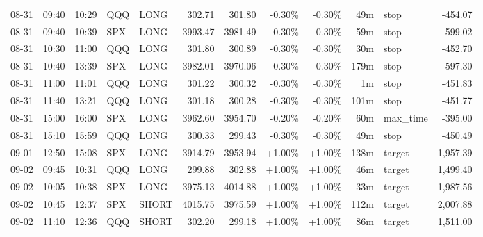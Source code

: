 \documentclass[11pt,a4paper,twoside]{article}
\begin{document}
\begin{center}
\begin{longtable}{>{\color{txtmain}}l l l l l r r r r r >{\color{txtmain}}l r}
08-31 & 09:40 & 10:29 & QQQ & LONG & 302.71 & 301.80 & \textcolor{lossred}{-0.30\%} & \textcolor{lossred}{-0.30\%} & 49m & stop & \textcolor{lossred}{-454.07} \\
08-31 & 09:40 & 10:39 & SPX & LONG & 3993.47 & 3981.49 & \textcolor{lossred}{-0.30\%} & \textcolor{lossred}{-0.30\%} & 59m & stop & \textcolor{lossred}{-599.02} \\
08-31 & 10:30 & 11:00 & QQQ & LONG & 301.80 & 300.89 & \textcolor{lossred}{-0.30\%} & \textcolor{lossred}{-0.30\%} & 30m & stop & \textcolor{lossred}{-452.70} \\
08-31 & 10:40 & 13:39 & SPX & LONG & 3982.01 & 3970.06 & \textcolor{lossred}{-0.30\%} & \textcolor{lossred}{-0.30\%} & 179m & stop & \textcolor{lossred}{-597.30} \\
08-31 & 11:00 & 11:01 & QQQ & LONG & 301.22 & 300.32 & \textcolor{lossred}{-0.30\%} & \textcolor{lossred}{-0.30\%} & 1m & stop & \textcolor{lossred}{-451.83} \\
08-31 & 11:40 & 13:21 & QQQ & LONG & 301.18 & 300.28 & \textcolor{lossred}{-0.30\%} & \textcolor{lossred}{-0.30\%} & 101m & stop & \textcolor{lossred}{-451.77} \\
08-31 & 15:00 & 16:00 & SPX & LONG & 3962.60 & 3954.70 & \textcolor{lossred}{-0.20\%} & \textcolor{lossred}{-0.20\%} & 60m & max\_time & \textcolor{lossred}{-395.00} \\
08-31 & 15:10 & 15:59 & QQQ & LONG & 300.33 & 299.43 & \textcolor{lossred}{-0.30\%} & \textcolor{lossred}{-0.30\%} & 49m & stop & \textcolor{lossred}{-450.49} \\
09-01 & 12:50 & 15:08 & SPX & LONG & 3914.79 & 3953.94 & \textcolor{wingreen}{+1.00\%} & \textcolor{wingreen}{+1.00\%} & 138m & target & \textcolor{wingreen}{1,957.39} \\
09-02 & 09:45 & 10:31 & QQQ & LONG & 299.88 & 302.88 & \textcolor{wingreen}{+1.00\%} & \textcolor{wingreen}{+1.00\%} & 46m & target & \textcolor{wingreen}{1,499.40} \\
09-02 & 10:05 & 10:38 & SPX & LONG & 3975.13 & 4014.88 & \textcolor{wingreen}{+1.00\%} & \textcolor{wingreen}{+1.00\%} & 33m & target & \textcolor{wingreen}{1,987.56} \\
09-02 & 10:45 & 12:37 & SPX & SHORT & 4015.75 & 3975.59 & \textcolor{wingreen}{+1.00\%} & \textcolor{wingreen}{+1.00\%} & 112m & target & \textcolor{wingreen}{2,007.88} \\
09-02 & 11:10 & 12:36 & QQQ & SHORT & 302.20 & 299.18 & \textcolor{wingreen}{+1.00\%} & \textcolor{wingreen}{+1.00\%} & 86m & target & \textcolor{wingreen}{1,511.00} \\

\end{longtable}
\end{center}
\end{document}
